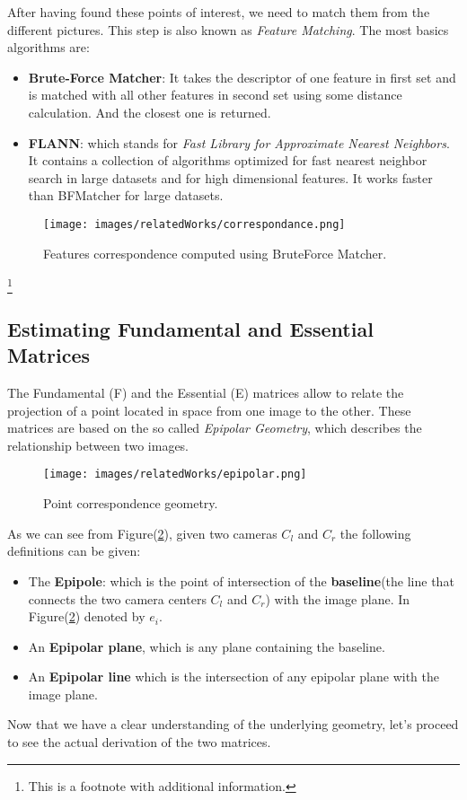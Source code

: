 After having found these points of interest, we need to match them from the different pictures. This step is also known
as \textit{Feature Matching}. The most basics algorithms are:
\begin{itemize}
    \item \textbf{Brute-Force Matcher}: It takes the descriptor of one feature in first set and is matched with all 
            other features in second set using some distance calculation. And the closest one is returned.
    \item \textbf{FLANN}: which stands for \textit{Fast Library for Approximate Nearest Neighbors}. It contains a collection of algorithms optimized
     for fast nearest neighbor search in large datasets and for high dimensional features. It works faster than BFMatcher for large datasets.
\end{itemize}

\begin{figure}
    \centering
    \texttt{[image: images/relatedWorks/correspondance.png]} %
    \caption{Features correspondence computed using BruteForce Matcher.}
    \label{fig:politoCorresponance}
\end{figure}


    \footnote{This is a footnote with additional information.}
 \subsection{Estimating Fundamental and Essential Matrices}
The Fundamental (F) and the Essential (E) matrices allow to relate the projection of a point located in space from one image to the other.
These matrices are based on the so called \textit{Epipolar Geometry}, which describes the relationship between two images.
\begin{figure}
    \centering
    \texttt{[image: images/relatedWorks/epipolar.png]} %
    \caption{Point correspondence geometry. }
    \label{fig:epipolar}
\end{figure}
As we can see from Figure(\ref{fig:epipolar}), given two cameras $C_l$ and $C_r$ the following definitions can be given:
\begin{itemize}
    \item The \textbf{Epipole}: which is the point of intersection of the \textbf{baseline}(the line that connects the two camera centers
    $C_l$ and $C_r$) with the image plane. In Figure(\ref{fig:epipolar}) denoted by $e_i$.
    \item An \textbf{Epipolar plane}, which is any plane containing the baseline.
    \item An \textbf{Epipolar line} which is the intersection of any epipolar plane with the image plane.

\end{itemize}
Now that we have a clear understanding of the underlying geometry, let's proceed to see the actual derivation of the
two matrices.

